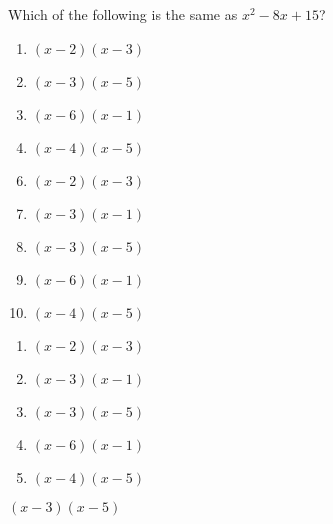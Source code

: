 


 Which of the following is the same as $x^{2}-8x+15$?


\ifsat
	\begin{enumerate}[label=\Alph*)]
		\item  $(x-2)(x-3)$
		\item  $(x-3)(x-5)$ %
		\item  $(x-6)(x-1)$
		\item  $(x-4)(x-5)$
	\end{enumerate}
\else
\fi

\ifacteven
	\begin{enumerate}[label=\textbf{\Alph*.},itemsep=\fill,align=left]
		\setcounter{enumii}{5}
		\item  $(x-2)(x-3)$
		\item  $(x-3)(x-1)$
		\item  $(x-3)(x-5)$ %
		\addtocounter{enumii}{1}
		\item  $(x-6)(x-1)$
		\item  $(x-4)(x-5)$
	\end{enumerate}
\else
\fi

\ifactodd
	\begin{enumerate}[label=\textbf{\Alph*.},itemsep=\fill,align=left]
		\item  $(x-2)(x-3)$
		\item  $(x-3)(x-1)$
		\item  $(x-3)(x-5)$ %
		\item  $(x-6)(x-1)$
		\item  $(x-4)(x-5)$
	\end{enumerate}
\else
\fi

\ifgridin
  $(x-3)(x-5)$ %
		
\else
\fi

